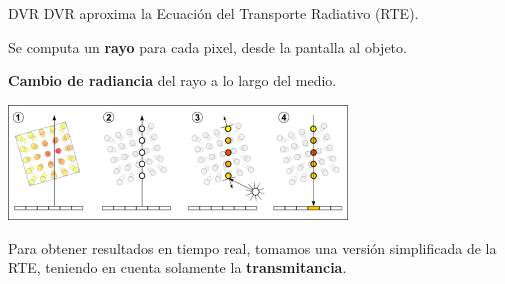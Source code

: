\documentclass[spanish,unknownkeysallowed,10pt]{beamer}
\begin{document}
\begin{frame}{DVR}
DVR aproxima la Ecuación del Transporte Radiativo (RTE).

Se computa un \textbf{rayo} para cada pixel, desde la pantalla al objeto.

\textbf{Cambio de radiancia} del rayo a lo largo del medio.


\centerline{\includegraphics[width=9cm]{../figures/dvr}}

Para obtener resultados en tiempo real, tomamos una versión simplificada de la RTE, teniendo en cuenta solamente la \textbf{transmitancia}.
\end{frame}
















\end{document}
